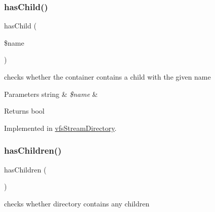 \mbox{\label{interfaceorg_1_1bovigo_1_1vfs_1_1vfs_stream_container_a55594af16e4f3167cfd8b6706778eb04}} 
\subsubsection{\texorpdfstring{has\+Child()}{hasChild()}}
{\footnotesize\ttfamily has\+Child (\begin{DoxyParamCaption}\item[{}]{\$name }\end{DoxyParamCaption})}

checks whether the container contains a child with the given name


\begin{DoxyParams}[1]{Parameters}
string & {\em \$name} & \\
\hline
\end{DoxyParams}
\begin{DoxyReturn}{Returns}
bool 
\end{DoxyReturn}


Implemented in \mbox{\hyperlink{classorg_1_1bovigo_1_1vfs_1_1vfs_stream_directory_a55594af16e4f3167cfd8b6706778eb04}{vfs\+Stream\+Directory}}.

\mbox{\label{interfaceorg_1_1bovigo_1_1vfs_1_1vfs_stream_container_a1332d27ba1ecefa899e393e83309735e}} 
\subsubsection{\texorpdfstring{has\+Children()}{hasChildren()}}
{\footnotesize\ttfamily has\+Children (\begin{DoxyParamCaption}{ }\end{DoxyParamCaption})}

checks whether directory contains any children


